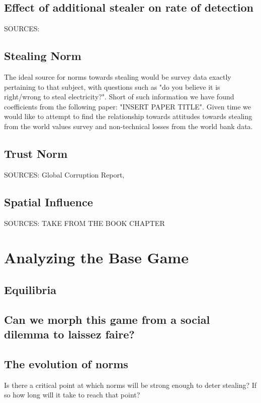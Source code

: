 \documentclass{article}
\begin{document}
\subsection{Effect of additional stealer on rate of detection}
SOURCES: 
\subsection{Stealing Norm}
The ideal source for norms towards stealing would be survey data exactly pertaining to that subject, with questions such as "do you believe it is right/wrong to steal electricity?". Short of such information we have found coefficients from the following paper:  "INSERT PAPER TITLE". Given time we would like to attempt to find the relationship towards attitudes towards stealing from the world values survey and non-technical losses from the world bank data.  

\subsection{Trust Norm}
SOURCES:  Global Corruption Report, 
\subsection{Spatial Influence}  
SOURCES: TAKE FROM THE BOOK CHAPTER 
\section{Analyzing the Base Game}

\subsection{Equilibria}

\subsection{Can we morph this game from a social dilemma to laissez faire?}

\subsection{The evolution of norms}
Is there a critical point at which norms will be strong enough to deter stealing? If so how long will it take to reach that point? 
\end{document}

